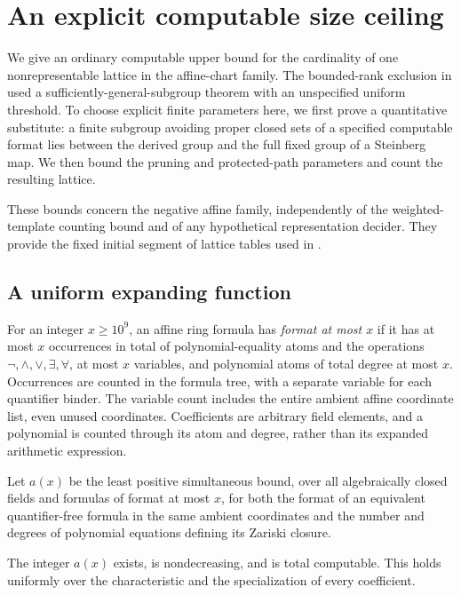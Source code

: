 \section{An explicit computable size ceiling}\label{sec:quantitative}

We give an ordinary computable upper bound for the cardinality of one
nonrepresentable lattice in the affine-chart family.  The bounded-rank
exclusion in  used a sufficiently-general-subgroup
theorem with an unspecified uniform threshold.  To choose explicit finite
parameters here, we first prove a quantitative substitute: a finite subgroup
avoiding proper closed sets of a specified computable format lies between
the derived group and the full fixed group of a Steinberg map.  We then
bound the pruning and protected-path parameters and count the resulting
lattice.

These bounds concern the negative affine family, independently of the
weighted-template counting bound and of any hypothetical representation
decider.  They provide the fixed initial segment of lattice tables used in
.

\subsection{A uniform expanding function}

\begin{definition}\label{q:format}
For an integer $x\ge10^9$, an affine ring formula has \emph{format at most
$x$} if it has at most $x$ occurrences in total of polynomial-equality atoms
and the operations $\neg,\land,\lor,\exists,\forall$, at most $x$ variables,
and polynomial atoms of total degree at most $x$.  Occurrences are counted in
the formula tree, with a separate variable for each quantifier binder.  The
variable count includes the entire ambient affine coordinate list, even
unused coordinates.  Coefficients are arbitrary field elements, and a
polynomial is counted through its atom and degree, rather than its expanded
arithmetic expression.

Let $a(x)$ be the least positive simultaneous bound, over all algebraically
closed fields and formulas of format at most $x$, for both the format of an
equivalent quantifier-free formula in the same ambient coordinates and the
number and degrees of polynomial equations defining its Zariski closure.
\end{definition}

\begin{lemma}\label{q:acf-computable}
The integer $a(x)$ exists, is nondecreasing, and is total computable.  This
holds uniformly over the characteristic and the specialization of every
coefficient.
\end{lemma}

